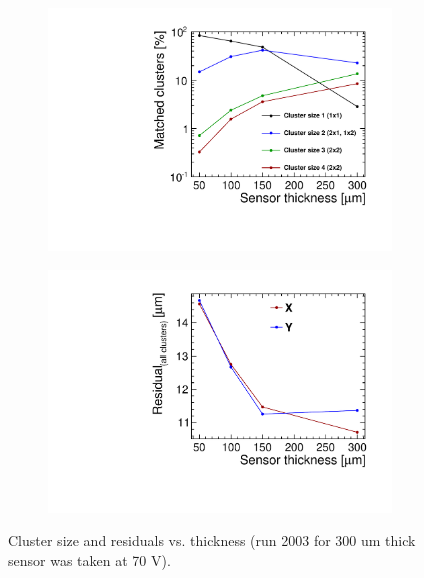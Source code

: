 \begin{figure}[htbp] \centering
  \begin{subfigure}[b]{0.45\textwidth}
    \includegraphics[width=\textwidth]{./figures/TestBeam/cluSize_vs_thickness.pdf}
    \caption{}
  \end{subfigure} \hfill
  \begin{subfigure}[b]{0.45\textwidth}
    \includegraphics[width=\textwidth]{./figures/TestBeam/residuals_vs_thickness.pdf}
    \caption{}
  \end{subfigure}
  \caption{Cluster size and residuals vs. thickness (run 2003 for 300 um thick sensor was taken at 70 V).}
  \label{fig:clusize_residuals_vs_thickness}
\end{figure}


